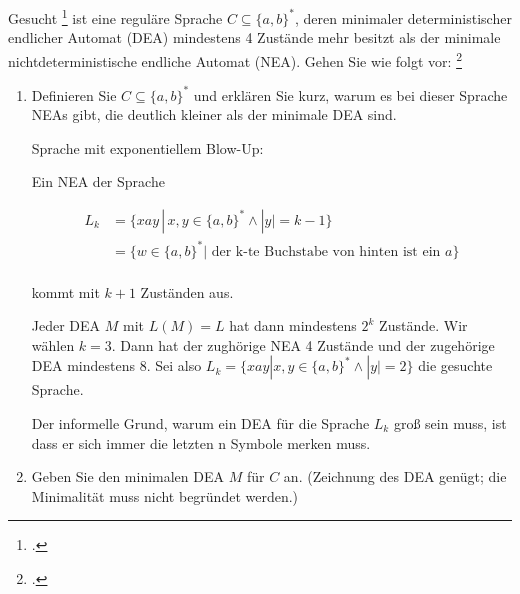 \documentclass{bschlangaul-aufgabe}
\begin{document}

Gesucht \footcite{examen:66115:2018:03} ist eine
reguläre Sprache $C \subseteq \{a, b\}^*$, deren minimaler
deterministischer endlicher Automat (DEA) mindestens 4 Zustände mehr
besitzt als der minimale nichtdeterministische endliche Automat (NEA).
Gehen Sie wie folgt vor:
\footcite[Seite 23, Aufgabe 13]{theo:ab:1}

\begin{enumerate}


\item Definieren Sie $C \subseteq \{a, b\}^*$ und erklären Sie kurz, warum es
bei dieser Sprache NEAs gibt, die deutlich kleiner als der minimale DEA
sind.

\begin{bAntwort}
Sprache mit exponentiellem Blow-Up:

Ein NEA der Sprache

\begin{align*}
L_k &= \{ xay \, | \, x, y \in \{a, b\}^* \land |y| = k - 1 \}\\
    &= \{ w \in \{a, b\}^* | \text{ der k-te Buchstabe von hinten ist ein } a\}\\
\end{align*}

kommt mit $k + 1$ Zuständen aus.

Jeder DEA $M$ mit $L(M) = L$ hat dann mindestens $2^k$ Zustände. Wir
wählen $k = 3$. Dann hat der zughörige NEA 4 Zustände und der zugehörige
DEA mindestens $8$. Sei also $L_k = \{ xay | x, y \in \{a, b\}^* \land
|y| = 2 \}$ die gesuchte Sprache.

Der informelle Grund, warum ein DEA für die Sprache $L_k$ groß sein muss, ist
dass er sich immer die letzten n Symbole merken muss.
\end{bAntwort}


\item Geben Sie den minimalen DEA $M$ für $C$ an.
(Zeichnung des DEA genügt; die Minimalität muss nicht begründet werden.)


\end{enumerate}
\end{document}
